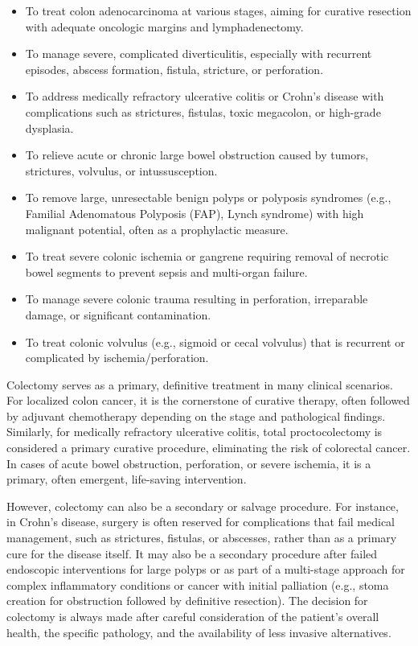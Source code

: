 \begin{itemize}
  \item To treat colon adenocarcinoma at various stages, aiming for curative resection with adequate oncologic margins and lymphadenectomy.
  \item To manage severe, complicated diverticulitis, especially with recurrent episodes, abscess formation, fistula, stricture, or perforation.
  \item To address medically refractory ulcerative colitis or Crohn's disease with complications such as strictures, fistulas, toxic megacolon, or high-grade dysplasia.
  \item To relieve acute or chronic large bowel obstruction caused by tumors, strictures, volvulus, or intussusception.
  \item To remove large, unresectable benign polyps or polyposis syndromes (e.g., Familial Adenomatous Polyposis (FAP), Lynch syndrome) with high malignant potential, often as a prophylactic measure.
  \item To treat severe colonic ischemia or gangrene requiring removal of necrotic bowel segments to prevent sepsis and multi-organ failure.
  \item To manage severe colonic trauma resulting in perforation, irreparable damage, or significant contamination.
  \item To treat colonic volvulus (e.g., sigmoid or cecal volvulus) that is recurrent or complicated by ischemia/perforation.
\end{itemize}

Colectomy serves as a primary, definitive treatment in many clinical scenarios. For localized colon cancer, it is the cornerstone of curative therapy, often followed by adjuvant chemotherapy depending on the stage and pathological findings. Similarly, for medically refractory ulcerative colitis, total proctocolectomy is considered a primary curative procedure, eliminating the risk of colorectal cancer. In cases of acute bowel obstruction, perforation, or severe ischemia, it is a primary, often emergent, life-saving intervention.

However, colectomy can also be a secondary or salvage procedure. For instance, in Crohn's disease, surgery is often reserved for complications that fail medical management, such as strictures, fistulas, or abscesses, rather than as a primary cure for the disease itself. It may also be a secondary procedure after failed endoscopic interventions for large polyps or as part of a multi-stage approach for complex inflammatory conditions or cancer with initial palliation (e.g., stoma creation for obstruction followed by definitive resection). The decision for colectomy is always made after careful consideration of the patient's overall health, the specific pathology, and the availability of less invasive alternatives.

